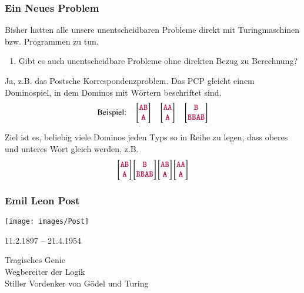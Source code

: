 \documentclass[aspectratio=1610,onlymath]{beamer}
\begin{document}
\begin{frame}\frametitle{Ein Neues Problem}

Bisher hatten alle unsere unentscheidbaren Probleme direkt mit
Turingmaschinen bzw. Programmen zu tun.\\
\begin{enumerate}[$\leadsto$]
\item Gibt es auch unentscheidbare Probleme ohne direkten Bezug zu Berechnung?
\end{enumerate}
\bigskip\pause

Ja, z.B. das \alert{Postsche Korrespondenzproblem}. Das PCP gleicht einem Dominospiel, in dem Dominos mit Wörtern beschriftet sind.
\[
\text{Beispiel:}\quad
\left[\begin{matrix}\mathtt{\textcolor{purple}{AB}}\\\mathtt{\textcolor{purple}{A}}\end{matrix}\right]\quad
\left[\begin{matrix}\mathtt{\textcolor{purple}{AA}}\\\mathtt{\textcolor{purple}{A}}\end{matrix}\right]\quad
\left[\begin{matrix}\mathtt{\textcolor{purple}{B}}\\\mathtt{\textcolor{purple}{BBAB}}\end{matrix}\right]
 \]

Ziel ist es, beliebig viele Dominos jeden Typs so in Reihe zu legen, dass oberes und unteres Wort gleich werden\pause, z.B.
\[
\left[\begin{matrix}\mathtt{\textcolor{purple}{AB}}\\\mathtt{\textcolor{purple}{A}}\end{matrix}\right]
\left[\begin{matrix}\mathtt{\textcolor{purple}{B}}\\\mathtt{\textcolor{purple}{BBAB}}\end{matrix}\right]
\left[\begin{matrix}\mathtt{\textcolor{purple}{AB}}\\\mathtt{\textcolor{purple}{A}}\end{matrix}\right]
\left[\begin{matrix}\mathtt{\textcolor{purple}{AA}}\\\mathtt{\textcolor{purple}{A}}\end{matrix}\right]
 \]


\end{frame}

\begin{frame}\label{frame_post}\frametitle{Emil Leon Post}

\begin{center}

\texttt{[image: images/Post]}

11.2.1897 -- 21.4.1954
\bigskip

Tragisches Genie\\
Wegbereiter der Logik\\
Stiller Vordenker von Gödel und Turing

\end{center}

\end{frame}
\end{document}
